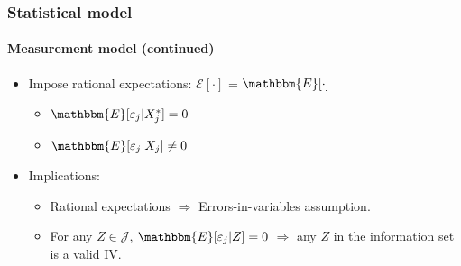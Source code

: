 \documentclass[10pt,letterpaper]{beamer}
\begin{document}

\begin{frame}
\frametitle{Statistical model} \framesubtitle{Measurement model (continued)}

\begin{itemize}
\item Impose rational expectations: $\mathcal{E}[\cdot]$ = $%
\mathbbm{E}[\cdot]$ 

\begin{itemize}
\item $\mathbbm{E}[\varepsilon_{j}|X^{*}_{j}]=0$ 

\item $\mathbbm{E}[\varepsilon_{j}|X_{j}]\neq0$ 
\end{itemize}

\item Implications: 

\begin{itemize}
\item Rational expectations $\Longrightarrow$ Errors-in-variables
assumption. 

\item For any $Z\in\mathcal{J}$, $\mathbbm{E}[\varepsilon_{j}|Z]=0$ $%
\Longrightarrow$ any $Z$ in the information set is a valid IV. 
\end{itemize}
\end{itemize}
\end{frame}

\end{document}
